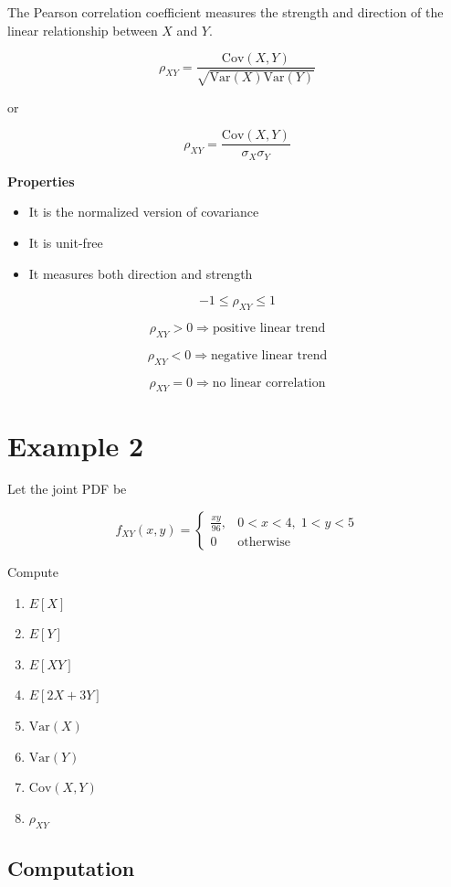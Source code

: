 \documentclass[12pt]{article}
\begin{document}
The Pearson correlation coefficient measures the strength and direction of the linear relationship between $X$ and $Y$.

\[
\rho_{XY} =
\frac{\text{Cov}(X,Y)}{\sqrt{\text{Var}(X)\text{Var}(Y)}}
\]

or

\[
\rho_{XY} = \frac{\text{Cov}(X,Y)}{\sigma_X \sigma_Y}
\]

\textbf{Properties}

\begin{itemize}
\item It is the normalized version of covariance
\item It is unit-free
\item It measures both direction and strength
\end{itemize}

\[
-1 \le \rho_{XY} \le 1
\]

\[
\rho_{XY} > 0 \Rightarrow \text{positive linear trend}
\]

\[
\rho_{XY} < 0 \Rightarrow \text{negative linear trend}
\]

\[
\rho_{XY} = 0 \Rightarrow \text{no linear correlation}
\]

\section{Example 2}

Let the joint PDF be

\[
f_{XY}(x,y)=
\begin{cases}
\frac{xy}{96}, & 0<x<4, \; 1<y<5 \\
0 & \text{otherwise}
\end{cases}
\]

Compute

\begin{enumerate}
\item $E[X]$
\item $E[Y]$
\item $E[XY]$
\item $E[2X+3Y]$
\item $\text{Var}(X)$
\item $\text{Var}(Y)$
\item $\text{Cov}(X,Y)$
\item $\rho_{XY}$
\end{enumerate}

\subsection{Computation}
\end{document}
